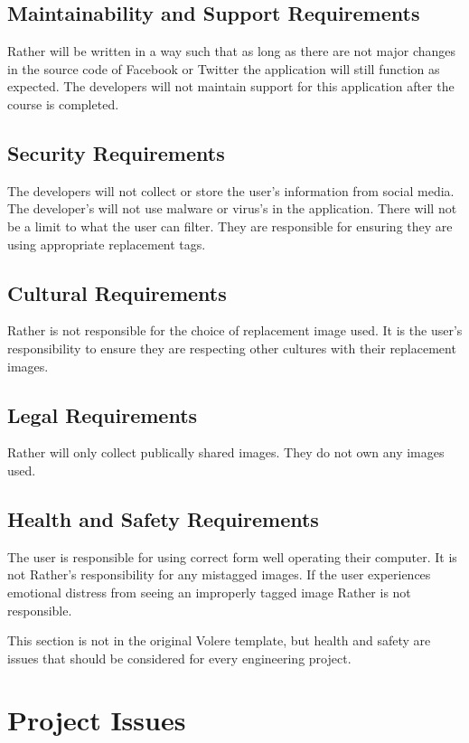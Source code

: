 \documentclass[12pt, titlepage]{article}
\begin{document}
\subsection{Maintainability and Support Requirements}
Rather will be written in a way such that as long as there are not major changes in the source code of Facebook or Twitter the application will still function as expected. The developers will not maintain support for this application after the course is completed.

\subsection{Security Requirements}
The developers will not collect or store the user's information from social media. The developer's will not use malware or virus's in the application. There will not be a limit to what the user can filter. They are responsible for ensuring they are using appropriate replacement tags. 

\subsection{Cultural Requirements}
Rather is not responsible for the choice of replacement image used. It is the user's responsibility to ensure they are respecting other cultures with their replacement images.

\subsection{Legal Requirements}
Rather will only collect publically shared images. They do not own any images used. 

\subsection{Health and Safety Requirements}
The user is responsible for using correct form well operating their computer. It is not Rather's responsibility for any mistagged images. If the user experiences emotional distress from seeing an improperly tagged image Rather is not responsible. 

This section is not in the original Volere template, but health and safety are
issues that should be considered for every engineering project.

\section{Project Issues}
\end{document}
